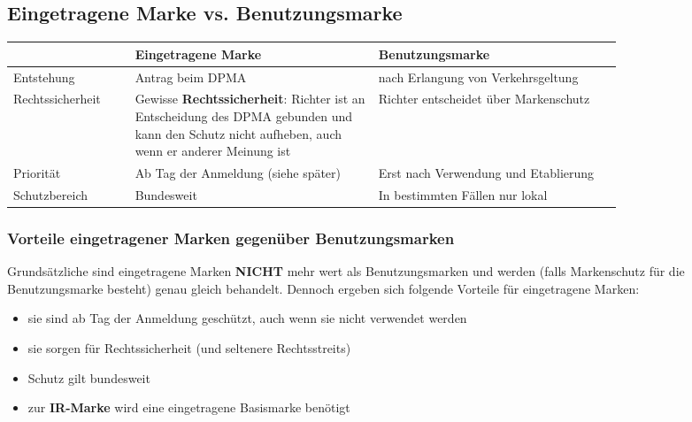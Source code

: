 \documentclass[12pt,A4]{extarticle}
\newcommand{\green}[1]{\textcolor{greenColor}{#1}}
\begin{document}
\subsection{Eingetragene Marke vs. Benutzungsmarke}
\bgroup
\def\arraystretch{1.5}
\begin{table}[h]
  \begin{tabular}{|l|p{0.4\linewidth}|p{0.4\linewidth}|}
    \hline \rowcolor{gray!30}
                     & Eingetragene Marke                                                                                                                                    & Benutzungsmarke                       \\ \hline
    Entstehung       & Antrag beim DPMA                                                                                                                                      & nach Erlangung von Verkehrsgeltung    \\ \hline
    Rechtssicherheit & Gewisse \textbf{Rechtssicherheit}: Richter ist an Entscheidung des DPMA gebunden und kann den Schutz nicht aufheben, auch wenn er anderer Meinung ist & Richter entscheidet über Markenschutz \\ \hline
    Priorität        & Ab Tag der Anmeldung (siehe später)                                                                                                                   & Erst nach Verwendung und Etablierung  \\ \hline
    Schutzbereich    & Bundesweit                                                                                                                                            & In bestimmten Fällen nur lokal        \\ \hline
  \end{tabular}
\end{table}
\egroup

\subsubsection{Vorteile eingetragener Marken gegenüber Benutzungsmarken}
Grundsätzliche sind eingetragene Marken \textbf{NICHT} mehr wert als Benutzungsmarken und werden (falls Markenschutz für die Benutzungsmarke besteht) genau gleich behandelt.
Dennoch ergeben sich folgende Vorteile für eingetragene Marken:
\begin{itemize}
  \item{sie sind \green{ab Tag der Anmeldung geschützt}, auch wenn sie nicht verwendet werden}
  \item{sie sorgen für \green{Rechtssicherheit} (und seltenere Rechtsstreits)}
  \item{Schutz gilt \green{bundesweit}}
  \item{zur \textbf{IR-Marke} wird eine eingetragene Basismarke benötigt}
\end{itemize}
\end{document}

